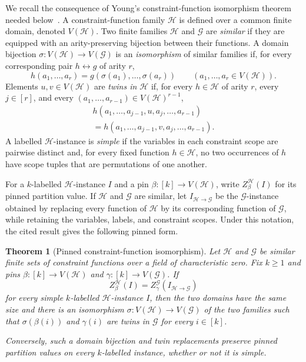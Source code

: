 \documentclass[11pt]{article}
\theoremstyle{plain}
\newtheorem{theorem}{Theorem}[section]
\theoremstyle{definition}
\theoremstyle{remark}
\begin{document}
We recall the consequence of Young's constraint-function isomorphism theorem
needed below~\cite[Definitions~3--7, Section~4.1, and
Corollary~35]{Young2025}.  A constraint-function
family $\mathcal H$ is defined over a common finite domain, denoted
$V(\mathcal H)$.  Two finite families $\mathcal H$ and $\mathcal G$ are
\emph{similar} if they are equipped with an arity-preserving bijection between
their functions.  A domain bijection $\sigma:V(\mathcal H)\to V(\mathcal G)$
is an \emph{isomorphism} of similar families if, for every corresponding pair
$h\leftrightarrow g$ of arity $r$,
\[
  h(a_1,\ldots,a_r)=g(\sigma(a_1),\ldots,\sigma(a_r))
  \qquad(a_1,\ldots,a_r\in V(\mathcal H)).
\]
Elements $u,v\in V(\mathcal H)$ are \emph{twins in $\mathcal H$} if, for
every $h\in\mathcal H$ of arity $r$, every $j\in[r]$, and every
$(a_1,\ldots,a_{r-1})\in V(\mathcal H)^{r-1}$,
\begin{multline*}
  h(a_1,\ldots,a_{j-1},u,a_j,\ldots,a_{r-1})\\
  =h(a_1,\ldots,a_{j-1},v,a_j,\ldots,a_{r-1}).
\end{multline*}
A labelled $\mathcal H$-instance is \emph{simple} if the
variables in each constraint scope are pairwise distinct and, for every fixed
function $h\in\mathcal H$, no two occurrences of $h$ have scope tuples that
are permutations of one another.

For a $k$-labelled $\mathcal H$-instance $I$ and a pin
$\beta:[k]\to V(\mathcal H)$, write $Z_{\beta}^{\mathcal H}(I)$ for its
pinned partition value.  If $\mathcal H$ and $\mathcal G$ are similar, let
$I_{\mathcal H\to\mathcal G}$ be the $\mathcal G$-instance obtained by
replacing every function of $\mathcal H$ by its corresponding function of
$\mathcal G$, while retaining the variables, labels, and constraint scopes.
Under this notation, the cited result gives the following pinned form.

\begin{theorem}[Pinned constraint-function isomorphism]
\label{thm:young-pinned}
Let $\mathcal H$ and $\mathcal G$ be similar finite sets of constraint
functions over a field of characteristic zero.  Fix $k\ge1$ and pins
$\beta:[k]\to V(\mathcal H)$ and $\gamma:[k]\to V(\mathcal G)$.
If
\begin{equation*}
  Z_{\beta}^{\mathcal H}(I)
  =Z_{\gamma}^{\mathcal G}(I_{\mathcal H\to\mathcal G})
\end{equation*}
for every simple $k$-labelled $\mathcal H$-instance $I$, then the two
domains have the same size and there is an isomorphism
$\sigma:V(\mathcal H)\to V(\mathcal G)$ of the two families such that
$\sigma(\beta(i))$ and $\gamma(i)$ are twins in $\mathcal G$ for every
$i\in[k]$.

Conversely, such a domain bijection and twin replacements preserve pinned
partition values on every $k$-labelled instance, whether or not it is simple.
\end{theorem}
\end{document}
